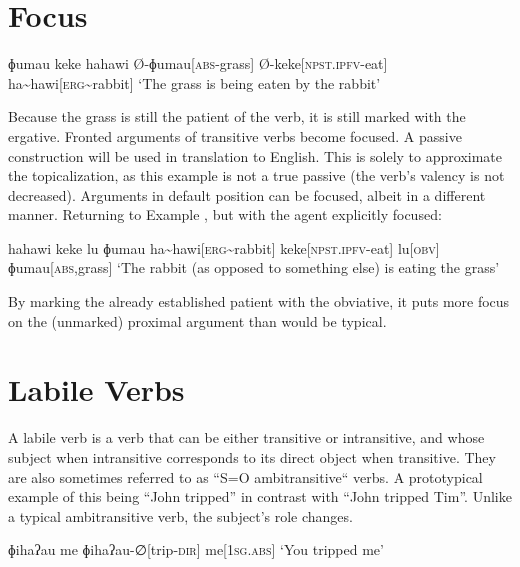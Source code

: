 \section{Focus}

\ex
\begingl
\glpreamble ɸumau keke hahawi
\endpreamble
Ø-ɸumau[\textsc{abs-}grass]
Ø-keke[\textsc{npst.ipfv-}eat]
ha\textasciitilde hawi[\textsc{erg\textasciitilde}rabbit]
\glft `The grass is being eaten by the rabbit'
\endgl
\xe

Because the grass is still the patient of the verb, it is still marked with the ergative. Fronted arguments of transitive verbs become focused. A passive construction will be used in translation to English. This is solely to approximate the topicalization, as this example is not a true passive (the verb's valency is not decreased). Arguments in default position can be focused, albeit in a different manner. Returning to Example , but with the agent explicitly focused:

\ex
\begingl
\glpreamble hahawi keke lu ɸumau
\endpreamble
ha\textasciitilde hawi[\textsc{erg\textasciitilde}rabbit]
keke[\textsc{npst.ipfv-}eat]
lu[\textsc{obv}]
ɸumau[\textsc{abs,}grass]
\glft `The rabbit (as opposed to something else) is eating the grass'
\endgl
\xe

By marking the already established patient with the obviative\footnotemark, it puts more focus on the (unmarked) proximal argument than would be typical.


\section{Labile Verbs}\label{sec:labile_verbs}

A labile verb is a verb that can be either transitive or intransitive, and whose subject when intransitive corresponds to its direct object when transitive. They are also sometimes referred to as ``S=O ambitransitive`` verbs. A prototypical example of this being ``John tripped'' in contrast with ``John tripped Tim''. Unlike a typical ambitransitive verb, the subject's role changes.

\ex
\begingl
\glpreamble ɸihaʔau me
\endpreamble
ɸihaʔau-∅[trip\textsc{-dir}]
me[\textsc{1sg.abs}]
\glft `You tripped me'
\endgl
\xe

